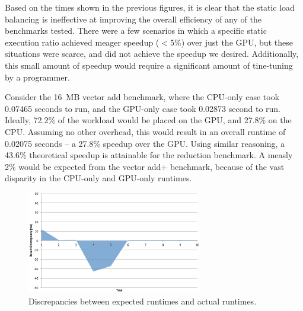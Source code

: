 \documentclass[journal]{IEEEtran}
\begin{document}


Based on the times shown in the previous figures, it is clear that the
static load balancing is ineffective at improving the overall efficiency
of any of the benchmarks tested.  There were a few scenarios in which
a specific static execution ratio achieved meager speedup ($<$5\%) over
just the GPU, but these situations were scarce, and did not achieve the
speedup we desired.  Additionally, this small amount of speedup would
require a significant amount of tine-tuning by a programmer.

Consider the 16~MB vector add benchmark, where the CPU-only case took
0.07465 seconds to run, and the GPU-only case took 0.02873 second to run.
Ideally, 72.2\% of the workload would be placed on the GPU, and 27.8\%
on the CPU.  Assuming no other overhead, this would result in an overall
runtime of 0.02075 seconds -- a 27.8\% speedup over the GPU.  Using similar
reasoning, a 43.6\% theoretical speedup is attainable for the reduction
benchmark.  A measly 2\% would be expected from the vector add+ benchmark,
because of the vast disparity in the CPU-only and GPU-only runtimes.

\begin{figure}[t]
\centering
\includegraphics[width=3.0in]{sequential_discrepancy}
\caption{Discrepancies between expected runtimes and actual runtimes.}
\label{fig:sequential_discrepancy}
\end{figure}
\end{document}
